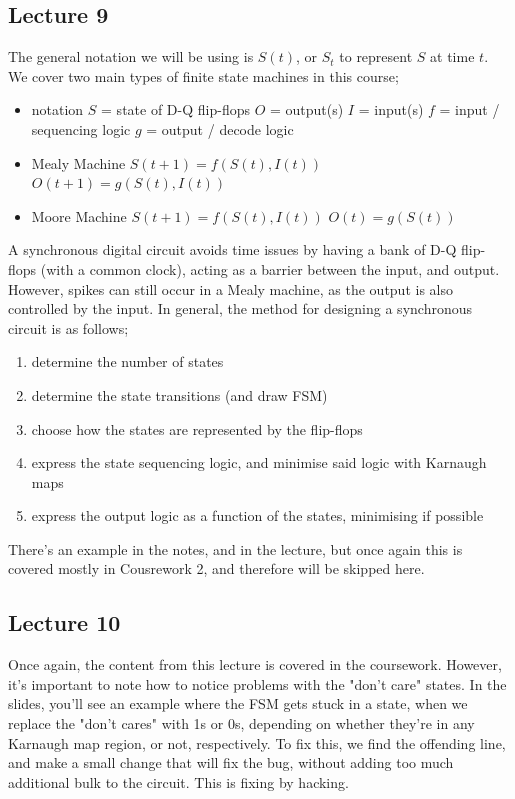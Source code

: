\documentclass[a4paper, 12pt]{article}
\begin{document}
        \subsection*{Lecture 9}
            The general notation we will be using is $S(t)$, or $S_t$ to represent $S$ at time $t$. We cover two main types of finite state machines in this course;
            \begin{itemize}
                \itemsep0em
                \item notation
                    \subitem $S$ = state of D-Q flip-flops
                    \subitem $O$ = output(s)
                    \subitem $I$ = input(s)
                    \subitem $f$ = input / sequencing logic
                    \subitem $g$ = output / decode logic
                \item Mealy Machine
                    \subitem $S(t + 1) = f(S(t), I(t))$
                    \subitem $O(t + 1) = g(S(t), I(t))$
                \item Moore Machine
                    \subitem $S(t + 1) = f(S(t), I(t))$
                    \subitem $O(t) = g(S(t))$
            \end{itemize}
            A synchronous digital circuit avoids time issues by having a bank of D-Q flip-flops (with a common clock), acting as a barrier between the input, and output. However, spikes can still occur in a Mealy machine, as the output is also controlled by the input. In general, the method for designing a synchronous circuit is as follows;
            \begin{enumerate}[1.]
                \itemsep0em
                \item determine the number of states
                \item determine the state transitions (and draw FSM)
                \item choose how the states are represented by the flip-flops
                \item express the state sequencing logic, and minimise said logic with Karnaugh maps
                \item express the output logic as a function of the states, minimising if possible
            \end{enumerate}
            There's an example in the notes, and in the lecture, but once again this is covered mostly in Cousrework 2, and therefore will be skipped here.
        \subsection*{Lecture 10}
            Once again, the content from this lecture is covered in the coursework. However, it's important to note how to notice problems with the "don't care" states. In the slides, you'll see an example where the FSM gets stuck in a state, when we replace the "don't cares" with 1s or 0s, depending on whether they're in any Karnaugh map region, or not, respectively. To fix this, we find the offending line, and make a small change that will fix the bug, without adding too much additional bulk to the circuit. This is fixing by hacking.
\end{document}
